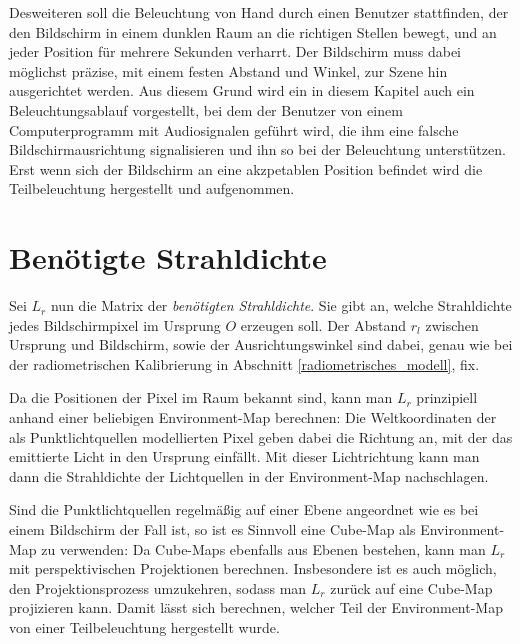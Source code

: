  Desweiteren soll die Beleuchtung von Hand durch einen Benutzer stattfinden, der den Bildschirm in einem dunklen Raum an die richtigen Stellen bewegt, und an jeder Position für mehrere Sekunden verharrt. 
 Der Bildschirm muss dabei möglichst präzise, mit einem festen Abstand und Winkel, zur Szene hin ausgerichtet werden.
 Aus diesem Grund wird ein in diesem Kapitel auch ein Beleuchtungsablauf vorgestellt, bei dem der Benutzer von einem Computerprogramm mit Audiosignalen geführt wird, die ihm eine falsche Bildschirmausrichtung signalisieren und ihn so bei der Beleuchtung unterstützen.
   Erst wenn sich der Bildschirm an eine akzpetablen Position befindet wird die Teilbeleuchtung hergestellt und aufgenommen.
  
  
 \section {Benötigte Strahldichte} \label{projection}
  
   Sei $L_r$ nun die Matrix der \emph{benötigten Strahldichte}. 
   Sie gibt an, welche Strahldichte jedes Bildschirmpixel im Ursprung $O$ erzeugen soll.
   Der Abstand $r_l$ zwischen Ursprung und Bildschirm, sowie der Ausrichtungswinkel sind dabei, genau wie bei der radiometrischen Kalibrierung in Abschnitt \ref{radiometrisches_modell}, fix.
   
  Da die Positionen der Pixel im Raum bekannt sind, kann man $L_r$ prinzipiell anhand einer beliebigen Environment-Map berechnen:
     Die Weltkoordinaten der als Punktlichtquellen modellierten Pixel geben dabei die Richtung an, mit der das emittierte Licht in den Ursprung einfällt. 
    Mit dieser Lichtrichtung kann man dann die Strahldichte der Lichtquellen in der Environment-Map nachschlagen. 
 
   Sind die Punktlichtquellen regelmäßig auf einer Ebene angeordnet wie es bei einem Bildschirm der Fall ist, so ist es Sinnvoll eine Cube-Map als Environment-Map zu verwenden:
   Da Cube-Maps ebenfalls aus Ebenen bestehen, kann man $L_r$ mit perspektivischen Projektionen berechnen.
   Insbesondere ist es auch möglich, den Projektionsprozess umzukehren,  sodass man $L_r$ zurück auf eine Cube-Map projizieren kann.
    Damit lässt sich berechnen, welcher Teil der Environment-Map von einer Teilbeleuchtung hergestellt wurde.
 
